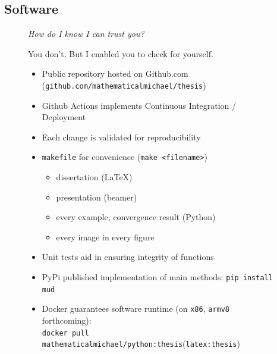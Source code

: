 \subsection{Software}

\begin{frame}[t]
\centering
\begin{figure}
\centering

\emph{How do I know I can trust you?}

\vspace{0.25in}

You don't. But I enabled you to check for yourself.

\vspace{0.25in}

\begin{itemize}
	\item Public repository hosted on Github.com ({\tt github.com/mathematicalmichael/thesis})
	\item Github Actions implements Continuous Integration / Deployment
	\item Each change is validated for reproducibility
	\item {\tt makefile} for convenience ({\tt make <filename>})
	\begin{itemize}
		\item dissertation (\LaTeX)
		\item presentation (beamer)
		\item every example, convergence result (Python)
		\item every image in every figure
	\end{itemize}
	\item Unit tests aid in ensuring integrity of functions
	\item PyPi published implementation of main methods: {\tt pip install mud}
	\item Docker guarantees software runtime (on {\tt x86}, {\tt armv8} forthcoming): \\ {\tt docker pull mathematicalmichael/python:thesis}({\tt latex:thesis})
\end{itemize}

\end{figure}

\end{frame}

